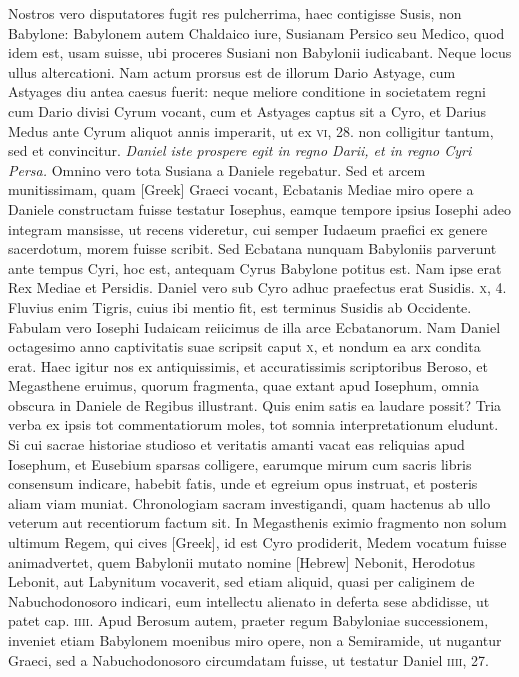 Nostros vero disputatores fugit res pulcherrima, haec contigisse
Susis, non Babylone: Babylonem autem Chaldaico iure, Susianam
Persico seu Medico, quod idem est, usam suisse, ubi proceres Susiani
non Babylonii iudicabant.
Neque locus ullus altercationi.
Nam actum prorsus est de illorum Dario Astyage, cum Astyages diu antea
caesus fuerit: neque meliore conditione in societatem regni cum
Dario divisi Cyrum vocant, cum et Astyages captus sit a Cyro, et
Darius Medus ante Cyrum aliquot annis imperarit, ut ex \textsc{vi}, 28.
non colligitur tantum, sed et convincitur.
\textit{Daniel iste prospere egit in regno Darii,
 et in regno Cyri Persa.}
Omnino vero tota Susiana a Daniele regebatur.
Sed et arcem munitissimam, quam \textgreek{[Greek]}
Graeci vocant, Ecbatanis Mediae miro opere a Daniele constructam
fuisse testatur Iosephus, eamque tempore ipsius Iosephi adeo
integram mansisse, ut recens videretur, cui semper Iudaeum praefici
ex genere sacerdotum, morem fuisse scribit.
Sed Ecbatana nunquam
Babyloniis parverunt ante tempus Cyri, hoc est, antequam
Cyrus Babylone potitus est.
Nam ipse erat Rex Mediae et Persidis.
Daniel vero sub Cyro adhuc praefectus erat Susidis. \textsc{x}, 4.
Fluvius
enim Tigris, cuius ibi mentio fit, est terminus Susidis ab Occidente.
Fabulam vero Iosephi Iudaicam reiicimus de illa arce Ecbatanorum.
Nam Daniel octagesimo anno captivitatis suae scripsit caput
\textsc{x}, et nondum ea arx condita erat.
Haec igitur nos ex antiquissimis,
et accuratissimis scriptoribus Beroso, et Megasthene eruimus, quorum
fragmenta, quae extant apud Iosephum, omnia obscura in Daniele
de Regibus illustrant.
Quis enim satis ea laudare possit?
Tria verba ex ipsis tot commentatiorum moles,
 tot somnia interpretationum
eludunt.
Si cui sacrae historiae studioso et veritatis amanti
vacat eas reliquias apud Iosephum, et Eusebium sparsas colligere,
earumque mirum cum sacris libris consensum indicare, habebit
fatis, unde et egreium opus instruat, et posteris aliam viam
muniat.
Chronologiam sacram investigandi, quam hactenus
ab ullo veterum aut recentiorum factum sit.
In Megasthenis eximio fragmento non solum ultimum Regem, qui cives
 \textgreek{[Greek]}, id
est Cyro prodiderit, Medem vocatum fuisse animadvertet, quem
Babylonii mutato nomine \texthebrew{[Hebrew]} Nebonit, Herodotus Lebonit,
aut Labynitum vocaverit, sed etiam aliquid, quasi per caliginem
de Nabuchodonosoro indicari, eum intellectu alienato in deferta
sese abdidisse, ut patet cap. \textsc{iiii}.
{}
Apud Berosum autem, praeter
regum Babyloniae successionem, inveniet etiam Babylonem moenibus
miro opere, non a Semiramide, ut nugantur Graeci, sed a Nabuchodonosoro
circumdatam fuisse, ut testatur Daniel \textsc{iiii}, 27.

